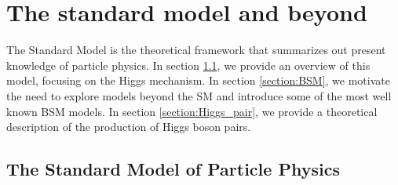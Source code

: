
\chapter{The standard model and beyond}
\label{chapter:SM}

The Standard Model is the theoretical framework that summarizes out present knowledge of particle physics. In section \ref{section:overview_SM}, we provide an overview of this model, focusing on the Higgs mechanism. In section \ref{section:BSM}, we motivate the need to explore models beyond the SM and introduce some of the most well known BSM models. In section \ref{section:Higgs_pair}, we provide a theoretical description of the production of Higgs boson pairs.


\section{The Standard Model of Particle Physics}
\label{section:overview_SM}

